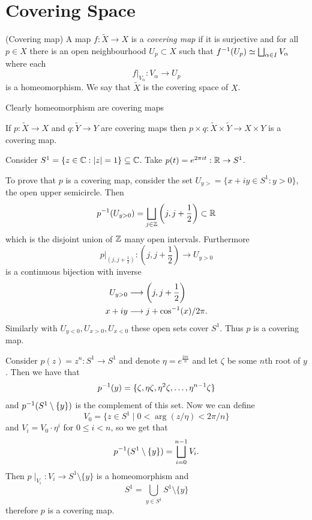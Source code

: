 \documentclass{article}
\begin{document}
\section{Covering Space}
\begin{definition}
	(Covering map) A map $ f:\tilde X\to X $ is a \textit{covering map} if it is surjective and for all $ p\in X $ there is an open neighbourhood $ U_p\subset X $ such that $ {f}^{-1} (U_p) \simeq \bigsqcup_{\alpha\in I} V_\alpha $ where each 
	\[
		f |_{V_\alpha}:V_\alpha \to U_p
	\]
	is a homeomorphism. We say that $ \tilde X $ is the covering space of $ X $.
\end{definition}
\begin{example}
  Clearly homeomorphism are covering maps
\end{example}
\begin{example}
  If $ p:\tilde X \to X $ and $ q:\tilde Y \to Y $ are covering maps then $ p\times q: \tilde X \times \tilde Y \to X\times Y $ is a covering map.
\end{example}
\begin{example}
	Consider $ S^1 = \{z \in \mathbb{C} : |z| = 1 \}\subseteq \mathbb{C} $. Take $ p(t) = e^{2\pi i t}:\mathbb{R}\to S^1 $.\par
	To prove that $ p $ is a covering map, consider the set $ U_{y>} = \{ x+iy \in S^1 : y> 0\} $, the open upper semicircle. Then
	\begin{align*}
		{p}^{-1}(U_{y>0}) = \bigsqcup_{j\in \mathbb{Z}} \left(j,j+\frac 12\right) \subset \mathbb{R}
	\end{align*}
	which is the disjoint union of $ \mathbb{Z} $ many open intervals. Furthermore 
	\[
		p|_{(j,j+\frac 12)}: \left(j,j+\frac 12\right) \to U_{y>0}
	\]
	is a continuous bijection with inverse
	\begin{align*}
		U_{y>0} &\longrightarrow \left(j,j+\frac 12\right) \\
		x+ iy &\longrightarrow j+{\cos}^{-1}(x)/2\pi.
	\end{align*}
	Similarly with $ U_{y<0}, U_{x>0}, U_{x<0} $ these open sets cover $ S^1 $. Thus $ p $ is a covering map.
\end{example}
\begin{example}
	Consider $ p(z) = z^n: S^1 \to S^1 $ and denote $ \eta = e^{\frac{2\pi i}n} $ and let $ \zeta $ be some $ n $th root of $ y $. Then we have that
	\[
		{p}^{-1}(y) = \{\zeta, \eta \zeta, \eta^2\zeta,\dots, \eta^{n-1}\zeta\}
	\]
	and $ {p}^{-1}(S^1 \setminus \{y\}) $ is the complement of this set. Now we can define
	\[
		V_0 = \{z\in S^1 \mid 0 < \arg(z/\eta) < 2\pi /n\}
	\]
	and $ V_i = V_0 \cdot \eta^i $ for $ 0\le i < n $, so we get that
	\[
		{p}^{-1}(S^1 \setminus \{y\}) = \bigsqcup_{i=0}^{n-1} V_i.
	\]
	Then $ p\mid_{V_i} : V_i\to S^1 \setminus \{y\} $ is a homeomorphism and
	\[
		S^1 =\bigcup_{y\in S^1} S^1 \setminus \{y\}
	\]
	therefore $ p $ is a covering map.
\end{example}
\end{document}
